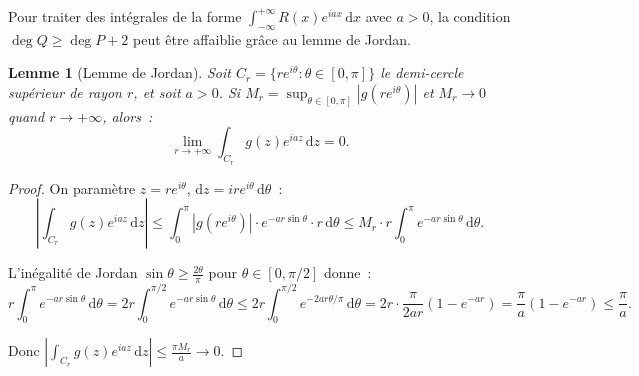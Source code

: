 \documentclass[12pt,a4paper,openany]{book}
\theoremstyle{definition}
\theoremstyle{plain}
\newtheorem{lemme}[definition]{Lemme}
\theoremstyle{remark}
\DeclareMathOperator{\re}{Re}
\DeclareMathOperator{\im}{Im}
\newcommand{\dd}{\mathrm{d}}
\newcommand{\abs}[1]{\left|#1\right|}
\begin{document}
Pour traiter des intégrales de la forme $\int_{-\infty}^{+\infty} R(x) e^{iax}\, \dd x$
avec $a > 0$, la condition $\deg Q \geq \deg P + 2$ peut être affaiblie grâce au
lemme de Jordan.

\begin{lemme}[Lemme de Jordan]\label{lem:jordan}
Soit $C_r = \{re^{i\theta} : \theta \in [0,\pi]\}$ le demi-cercle supérieur de
rayon $r$, et soit $a > 0$. Si $M_r = \sup_{\theta \in [0,\pi]} \abs{g(re^{i\theta})}$
et $M_r \to 0$ quand $r \to +\infty$, alors~:
\[
  \lim_{r \to +\infty} \int_{C_r} g(z) e^{iaz}\, \dd z = 0.
\]
\end{lemme}

\begin{proof}
On paramètre $z = re^{i\theta}$, $\dd z = ire^{i\theta}\,\dd\theta$~:
\[
  \left|\int_{C_r} g(z) e^{iaz}\, \dd z\right|
  \leq \int_0^{\pi} \abs{g(re^{i\theta})} \cdot e^{-ar\sin\theta} \cdot r\, \dd\theta
  \leq M_r \cdot r \int_0^{\pi} e^{-ar\sin\theta}\, \dd\theta.
\]

L'inégalité de Jordan $\sin\theta \geq \frac{2\theta}{\pi}$ pour
$\theta \in [0, \pi/2]$ donne~:
\[
  r \int_0^{\pi} e^{-ar\sin\theta}\, \dd\theta
  = 2r \int_0^{\pi/2} e^{-ar\sin\theta}\, \dd\theta
  \leq 2r \int_0^{\pi/2} e^{-2ar\theta/\pi}\, \dd\theta
  = 2r \cdot \frac{\pi}{2ar}\left(1 - e^{-ar}\right)
  = \frac{\pi}{a}\left(1 - e^{-ar}\right) \leq \frac{\pi}{a}.
\]

Donc $\left|\int_{C_r} g(z) e^{iaz}\, \dd z\right| \leq \frac{\pi M_r}{a} \to 0$.
\end{proof}

\begin{center}
\end{center}
\end{document}
